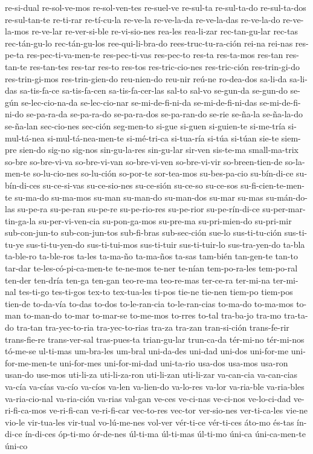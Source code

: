 {re-si-dual re-sol-ve-mos re-sol-ven-tes re-suel-ve re-sul-ta re-sul-ta-do re-sul-ta-dos
re-sul-tan-te re-ti-rar re-tí-cu-la re-ve-la re-ve-la-da re-ve-la-das re-ve-la-do re-ve-la-mos
re-ve-lar re-ver-si-ble re-vi-sio-nes rea-les rea-li-zar rec-tan-gu-lar rec-tas rec-tán-gu-lo
rec-tán-gu-los ree-qui-li-bra-do rees-truc-tu-ra-ción rei-na rei-nas res-pe-ta res-pec-ti-va-men-te
res-pec-ti-vas res-pec-to res-ta res-ta-mos res-tan res-tan-te res-tan-tes res-tar res-to res-tos
res-tric-cio-nes res-tric-ción res-trin-gi-do res-trin-gi-mos res-trin-gien-do reu-nien-do reu-nir
reú-ne ro-dea-dos sa-li-da sa-li-das sa-tis-fa-ce sa-tis-fa-cen sa-tis-fa-cer-las sal-to sal-vo
se-gun-da se-gun-do se-gún se-lec-cio-na-da se-lec-cio-nar se-mi-de-fi-ni-da se-mi-de-fi-ni-das
se-mi-de-fi-ni-do se-pa-ra-da se-pa-ra-do se-pa-ra-dos se-pa-ran-do se-rie se-ña-la se-ña-la-do
se-ña-lan sec-cio-nes sec-ción seg-men-to si-gue si-guen si-guien-te si-me-tría si-mul-tá-nea
si-mul-tá-nea-men-te si-mé-tri-ca si-tua-ría si-túa si-túan sie-te siem-pre sien-do sig-no sig-nos
sin-gu-la-res sin-gu-lar sir-ven sis-te-ma small-ma-trix so-bre so-bre-vi-va so-bre-vi-van
so-bre-vi-ven so-bre-vi-vir so-breen-tien-de so-la-men-te so-lu-cio-nes so-lu-ción so-por-te
sor-tea-mos su-bes-pa-cio su-bín-di-ce su-bín-di-ces su-ce-si-vas su-ce-sio-nes su-ce-sión su-ce-so
su-ce-sos su-fi-cien-te-men-te su-ma-do su-ma-mos su-man su-man-do su-man-dos su-mar su-mas
su-mán-do-las su-pe-ra su-pe-ran su-pe-re su-pe-rio-res su-pe-rior su-pe-rín-di-ce
su-per-mar-tin-ga-la su-per-vi-ven-cia su-pon-ga-mos su-pre-ma su-pri-mien-do su-pri-mir
sub-con-jun-to sub-con-jun-tos sub-fi-bras sub-sec-ción sue-lo sus-ti-tu-ción sus-ti-tu-ye
sus-ti-tu-yen-do sus-ti-tui-mos sus-ti-tuir sus-ti-tuir-lo sus-tra-yen-do ta-bla ta-ble-ro
ta-ble-ros ta-les ta-ma-ño ta-ma-ños ta-sas tam-bién tan-gen-te tan-to tar-dar
te-les-có-pi-ca-men-te te-ne-mos te-ner te-nían tem-po-ra-les tem-po-ral ten-der ten-dría ten-ga
ten-gan teo-re-ma teo-re-mas ter-ce-ra ter-mi-na ter-mi-nal tes-ti-go tes-ti-gos tex-to tex-tua-les
ti-pos tie-ne tie-nen tiem-po tiem-pos tien-de to-da-vía to-das to-dos to-le-ran-cia to-le-ran-cias
to-ma-do to-ma-mos to-man to-man-do to-mar to-mar-se to-me-mos to-rres to-tal tra-ba-jo tra-mo
tra-ta-do tra-tan tra-yec-to-ria tra-yec-to-rias tra-za tra-zan tran-si-ción trans-fe-rir
trans-fie-re trans-ver-sal tras-pues-ta trian-gu-lar trun-ca-da tér-mi-no tér-mi-nos tó-me-se
ul-ti-mas um-bra-les um-bral uni-da-des uni-dad uni-dos uni-for-me uni-for-me-men-te uni-for-mes
uni-for-mi-dad uni-ta-rio usa-dos usa-mos usa-ron usan-do use-mos uti-li-za uti-li-za-ron uti-li-zan
uti-li-zar va-can-cia va-can-cias va-cía va-cías va-cío va-cíos va-len va-lien-do va-lo-res va-lor
va-ria-ble va-ria-bles va-ria-cio-nal va-ria-ción va-rias val-gan ve-ces ve-ci-nas ve-ci-nos
ve-lo-ci-dad ve-ri-fi-ca-mos ve-ri-fi-can ve-ri-fi-car vec-to-res vec-tor ver-sio-nes ver-ti-ca-les
vie-ne vio-le vir-tua-les vir-tual vo-lú-me-nes vol-ver vér-ti-ce vér-ti-ces áto-mo és-tas ín-di-ce
ín-di-ces óp-ti-mo ór-de-nes úl-ti-ma úl-ti-mas úl-ti-mo úni-ca úni-ca-men-te úni-co
}
